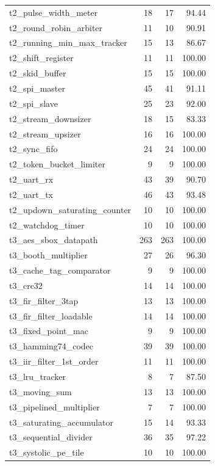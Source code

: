 \begin{tabular}{lrrr}
t2\_pulse\_width\_meter & 18 & 17 & 94.44 \\
t2\_round\_robin\_arbiter & 11 & 10 & 90.91 \\
t2\_running\_min\_max\_tracker & 15 & 13 & 86.67 \\
t2\_shift\_register & 11 & 11 & 100.00 \\
t2\_skid\_buffer & 15 & 15 & 100.00 \\
t2\_spi\_master & 45 & 41 & 91.11 \\
t2\_spi\_slave & 25 & 23 & 92.00 \\
t2\_stream\_downsizer & 18 & 15 & 83.33 \\
t2\_stream\_upsizer & 16 & 16 & 100.00 \\
t2\_sync\_fifo & 24 & 24 & 100.00 \\
t2\_token\_bucket\_limiter & 9 & 9 & 100.00 \\
t2\_uart\_rx & 43 & 39 & 90.70 \\
t2\_uart\_tx & 46 & 43 & 93.48 \\
t2\_updown\_saturating\_counter & 10 & 10 & 100.00 \\
t2\_watchdog\_timer & 10 & 10 & 100.00 \\
t3\_aes\_sbox\_datapath & 263 & 263 & 100.00 \\
t3\_booth\_multiplier & 27 & 26 & 96.30 \\
t3\_cache\_tag\_comparator & 9 & 9 & 100.00 \\
t3\_crc32 & 14 & 14 & 100.00 \\
t3\_fir\_filter\_3tap & 13 & 13 & 100.00 \\
t3\_fir\_filter\_loadable & 14 & 14 & 100.00 \\
t3\_fixed\_point\_mac & 9 & 9 & 100.00 \\
t3\_hamming74\_codec & 39 & 39 & 100.00 \\
t3\_iir\_filter\_1st\_order & 11 & 11 & 100.00 \\
t3\_lru\_tracker & 8 & 7 & 87.50 \\
t3\_moving\_sum & 13 & 13 & 100.00 \\
t3\_pipelined\_multiplier & 7 & 7 & 100.00 \\
t3\_saturating\_accumulator & 15 & 14 & 93.33 \\
t3\_sequential\_divider & 36 & 35 & 97.22 \\
t3\_systolic\_pe\_tile & 10 & 10 & 100.00 \\
\bottomrule
\end{tabular}
